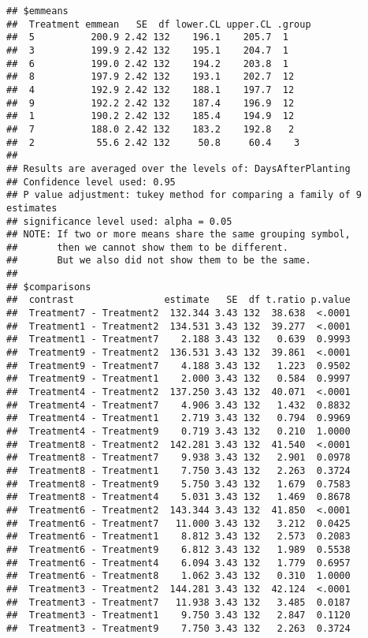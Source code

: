 \documentclass[
]{article}
\begin{document}
\begin{verbatim}
## $emmeans
##  Treatment emmean   SE  df lower.CL upper.CL .group
##  5          200.9 2.42 132    196.1    205.7  1    
##  3          199.9 2.42 132    195.1    204.7  1    
##  6          199.0 2.42 132    194.2    203.8  1    
##  8          197.9 2.42 132    193.1    202.7  12   
##  4          192.9 2.42 132    188.1    197.7  12   
##  9          192.2 2.42 132    187.4    196.9  12   
##  1          190.2 2.42 132    185.4    194.9  12   
##  7          188.0 2.42 132    183.2    192.8   2   
##  2           55.6 2.42 132     50.8     60.4    3  
## 
## Results are averaged over the levels of: DaysAfterPlanting 
## Confidence level used: 0.95 
## P value adjustment: tukey method for comparing a family of 9 estimates 
## significance level used: alpha = 0.05 
## NOTE: If two or more means share the same grouping symbol,
##       then we cannot show them to be different.
##       But we also did not show them to be the same. 
## 
## $comparisons
##  contrast                estimate   SE  df t.ratio p.value
##  Treatment7 - Treatment2  132.344 3.43 132  38.638  <.0001
##  Treatment1 - Treatment2  134.531 3.43 132  39.277  <.0001
##  Treatment1 - Treatment7    2.188 3.43 132   0.639  0.9993
##  Treatment9 - Treatment2  136.531 3.43 132  39.861  <.0001
##  Treatment9 - Treatment7    4.188 3.43 132   1.223  0.9502
##  Treatment9 - Treatment1    2.000 3.43 132   0.584  0.9997
##  Treatment4 - Treatment2  137.250 3.43 132  40.071  <.0001
##  Treatment4 - Treatment7    4.906 3.43 132   1.432  0.8832
##  Treatment4 - Treatment1    2.719 3.43 132   0.794  0.9969
##  Treatment4 - Treatment9    0.719 3.43 132   0.210  1.0000
##  Treatment8 - Treatment2  142.281 3.43 132  41.540  <.0001
##  Treatment8 - Treatment7    9.938 3.43 132   2.901  0.0978
##  Treatment8 - Treatment1    7.750 3.43 132   2.263  0.3724
##  Treatment8 - Treatment9    5.750 3.43 132   1.679  0.7583
##  Treatment8 - Treatment4    5.031 3.43 132   1.469  0.8678
##  Treatment6 - Treatment2  143.344 3.43 132  41.850  <.0001
##  Treatment6 - Treatment7   11.000 3.43 132   3.212  0.0425
##  Treatment6 - Treatment1    8.812 3.43 132   2.573  0.2083
##  Treatment6 - Treatment9    6.812 3.43 132   1.989  0.5538
##  Treatment6 - Treatment4    6.094 3.43 132   1.779  0.6957
##  Treatment6 - Treatment8    1.062 3.43 132   0.310  1.0000
##  Treatment3 - Treatment2  144.281 3.43 132  42.124  <.0001
##  Treatment3 - Treatment7   11.938 3.43 132   3.485  0.0187
##  Treatment3 - Treatment1    9.750 3.43 132   2.847  0.1120
##  Treatment3 - Treatment9    7.750 3.43 132   2.263  0.3724

\end{verbatim}
\end{document}
